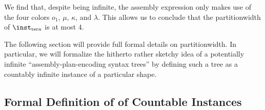 \begin{example}

We find that, despite being infinite, the assembly expression only makes use of the four colors $o_1$, $\mu$, $\kappa$, and $\lambda$. This allows us to conclude that the partitionwidth of   
$\inst_\mathrm{tern}$ is at most $4$.
\end{example}

 
The following section will provide full formal details on partitionwidth. In particular, we will formalize the hitherto rather sketchy idea of a potentially infinite ``assembly-plan-encoding syntax trees'' by defining such a tree as a countably infinite instance of a particular shape. 


\subsection{Formal Definition of \Partitionwidth{} of Countable Instances}\label{sec:cwdef}


\newcommand{\szero}{\pred{Succ}_0}
\newcommand{\sone}{\pred{Succ}_1}
\newcommand{\ibtree}{\mathcal{T}_\mathrm{bin}}
\newcommand{\colconsig}{(\cols, \mathrm{Cnst}, \Sigma)}
\newcommand{\decorum}{\mathrm{Dec}\colconsig}
\newcommand{\predupdate}[1]{\pred{#1}}
\newcommand{\instructionset}{\mathrm{Instr}(\cols, \Sigma)}
\newcommand{\instruction}{\mathrm{Instr}}
\newcommand{\instr}{\instruction}

